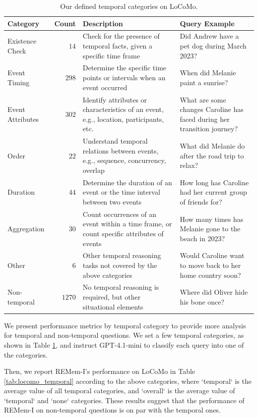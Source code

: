 \documentclass{article} %
\begin{document}
\begin{table}[tbh]
\centering
\small
\caption{Our defined temporal categories on LoCoMo.}
\begin{tabular}{l r p{4.6cm} p{4.6cm}}
\toprule
\textbf{Category} & \textbf{Count} & \textbf{Description} & \textbf{Query Example} \\
\midrule
Existence Check &
$14$ &
Check for the presence of temporal facts, given a specific time frame &
Did Andrew have a pet dog during March 2023? \\
Event Timing &
$298$ &
Determine the specific time points or intervals when an event occurred &
When did Melanie paint a sunrise? \\
Event Attributes &
$302$ &
Identify attributes or characteristics of an event, e.g., location, participants, etc. &
What are some changes Caroline has faced during her transition journey? \\
Order &
$22$ &
Understand temporal relations between events, e.g., sequence, concurrency, overlap &
What did Melanie do after the road trip to relax? \\
Duration &
$44$ &
Determine the duration of an event or the time interval between two events &
How long has Caroline had her current group of friends for? \\
Aggregation &
$30$ &
Count occurrences of an event within a time frame, or count specific attributes of events &
How many times has Melanie gone to the beach in 2023? \\
Other &
$6$ &
Other temporal reasoning tasks not covered by the above categories &
Would Caroline want to move back to her home country soon? \\
Non-temporal &
$1270$ &
No temporal reasoning is required, but other situational elements&
Where did Oliver hide his bone once? \\
\bottomrule
\end{tabular}
\label{tab:temporal_categories}
\end{table}

We present performance metrics by temporal category to provide more analysis for temporal and non-temporal questions.
We set a few temporal categories, as shown in Table \ref{tab:temporal_categories}, and instruct GPT-4.1-mini to classify each query into one of the categories.


Then, we report REMem-I’s performance on LoCoMo in Table \ref{tab:locomo_temporal} according to the above categories, where `temporal` is the average value of all temporal categories, and `overall` is the average value of `temporal` and `none` categories. 
These results suggest that the performance of REMem-I on non-temporal questions is on par with the temporal ones.
\end{document}

